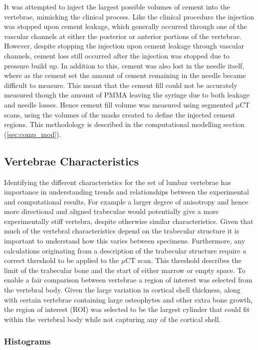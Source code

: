 It was attempted to inject the largest possible volumes of cement into the
vertebrae, mimicking the clinical process.
Like the clinical procedure the injection was stopped upon cement leakage,
which generally occurred through one of the vascular channels at either the
posterior or anterior portions of the vertebrae.
However, despite stopping the injection upon cement leakage through vascular
channels, cement loss still occurred after the injection was stopped due to
pressure build up.
In addition to this, cement was also lost in the needle itself, where as the
cement set the amount of cement remaining in the needle became difficult to
measure.
This meant that the cement fill could not be accurately measured though the amount of PMMA
leaving the syringe due to both leakage and needle losses.
Hence cement fill volume was measured using segmented $\mu$CT scans, using the
volumes of the masks created to define the injected cement regions. This
methodology is described in the computational modelling section
(\cref{sec:comp_mod}).

\subsection{Vertebrae Characteristics}

Identifying the different characteristics for the set of lumbar vertebrae has
importance in understanding trends and relationships between the experimental
and computational results. For example a larger degree of anisotropy and hence
more directional and aligned trabeculae would potentially give a more
experimentally stiff vertebra, despite otherwise similar characteristics. Given
that much of the vertebral characteristics depend on the trabecular structure
it
is important to understand how this varies between specimens. Furthermore, any
calculations originating from a description of the trabecular structure require
a correct threshold to be applied to the $\mu$CT scan. This threshold describes
the limit of the trabecular bone and the start of either marrow or empty
space. To enable a fair comparison between vertebrae a region of interest was
selected from the vertebral body. Given the large variation in cortical shell
thickness, along with certain vertebrae containing large osteophytes and other
extra bone growth, the region of interest (ROI) was selected to be the largest
cylinder that could fit within the vertebral body while not capturing any of
the
cortical shell. %

\subsubsection{Histograms}

